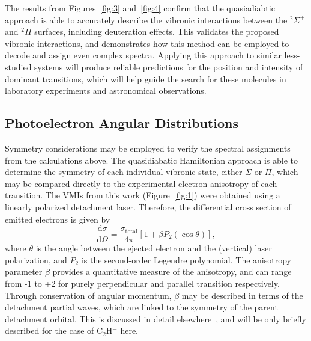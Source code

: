 \documentclass[journal=jpcafh,manuscript=article,layout=onecolumn, 12pt]{achemso}
\begin{document}
The results from Figures~\ref{fig:3} and~\ref{fig:4} confirm that the quasiadiabtic approach is able to accurately describe the vibronic interactions between the $^2\Sigma^+$ and $^2\Pi$ surfaces, including deuteration effects. This validates the proposed vibronic interactions, and demonstrates how this method can be employed to decode and assign even complex spectra. Applying this approach to similar less-studied systems will produce reliable predictions for the position and intensity of dominant transitions, which will help guide the search for these molecules in laboratory experiments and astronomical observations. 




\subsection{Photoelectron Angular Distributions}
Symmetry considerations may be employed to verify the spectral assignments from the calculations above. The quasidiabatic Hamiltonian approach is able to determine the symmetry of each individual vibronic state, either $\Sigma$ or $\Pi$, which may be compared directly to the experimental electron anisotropy of each transition. The VMIs from this work (Figure~\ref{fig:1}) were obtained using a linearly polarized detachment laser. Therefore, the differential cross section of emitted electrons is given by  
\begin{equation}
	\frac{\text{d}\sigma}{\text{d}\Omega}=\frac{\sigma_{\text{total}}}{4\pi}[1+\beta P_{2}(\cos\theta)],
	\label{eq:beta1}
\end{equation}
where $\theta$ is the angle between the ejected electron and the (vertical) 
laser polarization, and $P_2$ is the second-order Legendre polynomial. The anisotropy parameter $\beta$ provides a quantitative measure of the anisotropy, and can range from -1 to +2 for purely perpendicular and parallel transition respectively. Through conservation of angular momentum, $\beta$ may be described in terms of the detachment partial waves, which are linked to the symmetry of the parent detachment orbital. This is discussed in detail elsewhere~\cite{khu14,law19}, and will be only briefly described for the case of C$_2$H$^-$ here. 
\end{document}
